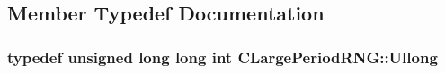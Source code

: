 \subsection{Member Typedef Documentation}
\hypertarget{class_c_large_period_r_n_g_aaf7ace659133533b97464a9b7538948d}{
\subsubsection[{Ullong}]{\setlength{\rightskip}{0pt plus 5cm}typedef unsigned long long int {\bf C\-Large\-Period\-R\-N\-G\-::\-Ullong}\hspace{0.3cm}{\ttfamily [private]}}}\label{class_c_large_period_r_n_g_aaf7ace659133533b97464a9b7538948d}


